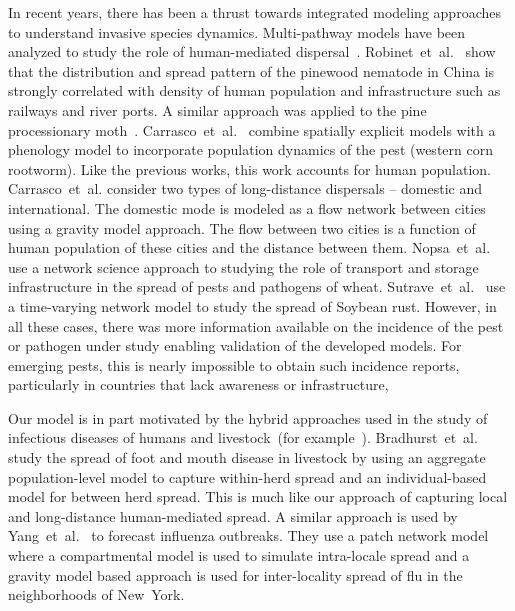 \documentclass[11pt]{article}
\theoremstyle{definition}
\begin{document}
In recent years, there has been a thrust towards integrated modeling
approaches to understand invasive species dynamics. Multi-pathway models
have been analyzed to study the role of human-mediated
dispersal~\cite{robinet2009role,robinet2012human,carrasco2010unveiling}.
Robinet~et~al.~\cite{robinet2009role} show that the distribution and spread
pattern of the pinewood nematode in China is strongly correlated with
density of human population and infrastructure such as railways and river
ports. A similar approach was applied to the pine processionary
moth~\cite{robinet2012human}.  Carrasco~et~al.~\cite{carrasco2010unveiling}
combine spatially explicit models with a phenology model to incorporate
population dynamics of the pest (western corn rootworm). Like the previous
works, this work accounts for human population. Carrasco~et~al. consider two types of
long-distance dispersals -- domestic and international. The domestic mode
is modeled as a flow network between cities using a gravity model approach.
The flow between two cities is a function of human population of these
cities and the distance between them.
Nopsa~et~al.~\cite{nopsa2015ecological} use a network science approach to
studying the role of transport and storage infrastructure in the spread of
pests and pathogens of wheat. Sutrave~et~al.~\cite{sutrave2012identifying}
use a time-varying network model to study the spread of Soybean rust.
However, in all these cases, there was more information available on the
incidence of the pest or pathogen under study enabling validation of the
developed models. For emerging pests, this is nearly impossible to obtain
such incidence reports, particularly
in countries that lack awareness or infrastructure,

Our model is in part motivated by the hybrid approaches used in the study of
infectious diseases of humans and livestock~(for
example~\cite{bradhurst2015hybrid,yang2016}).
Bradhurst~et~al.~\cite{bradhurst2015hybrid} study the spread of foot and
mouth disease in livestock by using an aggregate population-level model to
capture within-herd spread and an individual-based model for between herd
spread. This is much like our approach of capturing local and long-distance
human-mediated spread. A similar approach is used by
Yang~et~al.~\cite{yang2016} to forecast influenza outbreaks. They use a
patch network model where a compartmental model is used to simulate
intra-locale spread and a gravity model based approach is used for
inter-locality spread of flu in the neighborhoods of New~York.
\end{document}
